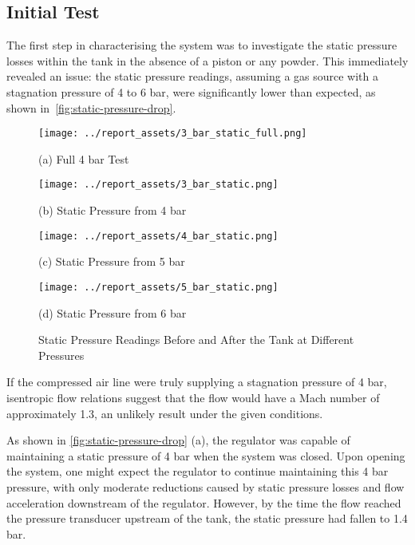 \subsection{Initial Test}
The first step in characterising the system was to investigate the static pressure losses within the tank in the absence of a piston or any powder. This immediately revealed an issue: the static pressure readings, assuming a gas source with a stagnation pressure of 4 to 6 bar, were significantly lower than expected, as shown in~\autoref{fig:static-pressure-drop}.
\begin{figure}[htbp]
    \centering

    \begin{minipage}{0.45\textwidth}
        \centering
        \texttt{[image: ../report\_assets/3\_bar\_static\_full.png]}
        \caption*{(a) Full 4 bar Test}
    \end{minipage}    
    \hfill
    \begin{minipage}{0.45\textwidth}
        \centering
        \texttt{[image: ../report\_assets/3\_bar\_static.png]}
        \caption*{(b) Static Pressure from 4 bar}
    \end{minipage}    
    \begin{minipage}{0.45\textwidth}
        \centering
        \texttt{[image: ../report\_assets/4\_bar\_static.png]}
        \caption*{(c) Static Pressure from 5 bar}
    \end{minipage}    
    \hfill
    \begin{minipage}{0.45\textwidth}
        \centering
        \texttt{[image: ../report\_assets/5\_bar\_static.png]}
        \caption*{(d) Static Pressure from 6 bar}
    \end{minipage}    

    \caption{Static Pressure Readings Before and After the Tank at Different Pressures}\label{fig:static-pressure-drop}
\end{figure}    
If the compressed air line were truly supplying a stagnation pressure of 4 bar, isentropic flow relations suggest that the flow would have a Mach number of approximately 1.3, an unlikely result under the given conditions.

As shown in \autoref{fig:static-pressure-drop} (a), the regulator was capable of maintaining a static pressure of 4 bar when the system was closed. Upon opening the system, one might expect the regulator to continue maintaining this 4 bar pressure, with only moderate reductions caused by static pressure losses and flow acceleration downstream of the regulator. However, by the time the flow reached the pressure transducer upstream of the tank, the static pressure had fallen to 1.4 bar.

